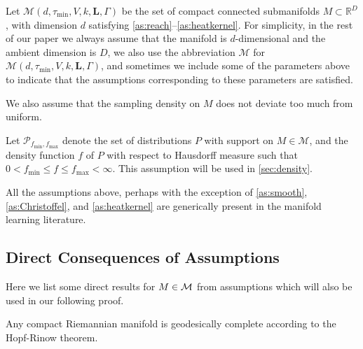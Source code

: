 Let $\mathcal{M}(d,\tau_{\min},V,k,\textbf{L},\Gamma)$ be the set of compact connected submanifolds $M \subset \mathbb{R}^D$, with dimension $d$ satisfying \cref{as:reach}--\cref{as:heatkernel}. For simplicity, in the rest of our paper we always assume that the manifold is $d$-dimensional and the ambient dimension is $D$, we also use the abbreviation $\mathcal{M}$ for $\mathcal{M}(d,\tau_{\min},V,k,\textbf{L},\Gamma)$, and sometimes we include some of the parameters above to indicate that the assumptions corresponding to these parameters are satisfied.


We also assume that the sampling density on $M$ does not deviate too much from uniform.
\begin{assumption}[Density]
\label{ass:density}
  Let $\mathcal{P}_{f_{\min},f_{\max}}$ denote the set of distributions $P$ with support on $M \in \mathcal{M}$, and the density function $f$ of $P$ with respect to Hausdorff measure such that $0<f_{\min}\leq f \leq f_{\max}<\infty$. This assumption will be used in \cref{sec:density}.
\end{assumption}

All the assumptions above, perhaps with the exception of \cref{as:smooth}, \cref{as:Christoffel}, and \cref{as:heatkernel} are generically present in the manifold learning literature.


\subsection{Direct Consequences of Assumptions}
Here we list some direct results for $M \in \mathcal{M}$ from assumptions which will also be used in our following proof.

\begin{corollary}\cite{do1992riemannian}
	Any compact Riemannian manifold is geodesically complete according to the Hopf-Rinow theorem.
\end{corollary}


